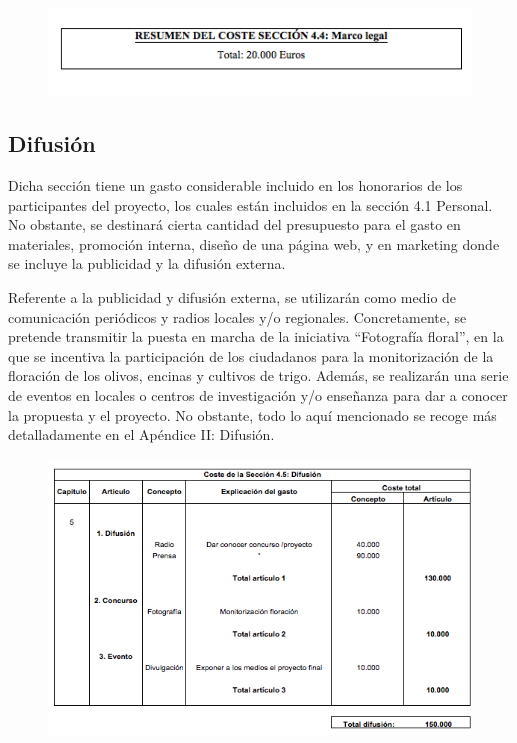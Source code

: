 \documentclass[12pt,oneside,a4paper]{article}
\numberwithin{figure}{section}
\begin{document}
\begin{figure}[H]
\begin{center}
\includegraphics[scale=.8]{Legal2.png}
\end{center}
\end{figure}


\subsection{Difusión}

Dicha sección tiene un gasto considerable incluido en los honorarios de los participantes del proyecto, los cuales están incluidos en la sección 4.1 Personal. No obstante, se destinará cierta cantidad del presupuesto para el gasto en materiales, promoción interna, diseño de una página web, y en marketing donde se incluye la publicidad y la difusión externa. 

Referente a la publicidad y difusión externa, se utilizarán como medio de comunicación periódicos y radios locales y/o regionales. Concretamente, se pretende transmitir la puesta en marcha de la iniciativa “Fotografía floral”, en la que se incentiva la participación de los ciudadanos para la monitorización de la floración de los olivos, encinas y cultivos de trigo. Además, se realizarán una serie de eventos en locales o centros de investigación y/o enseñanza para dar a conocer la propuesta y el proyecto. No obstante, todo lo aquí mencionado se recoge más detalladamente en el Apéndice II: Difusión.

\begin{figure}[H]
\begin{center}
\includegraphics[scale=.8]{Difusion.png}
\end{center}
\end{figure}
\end{document}
